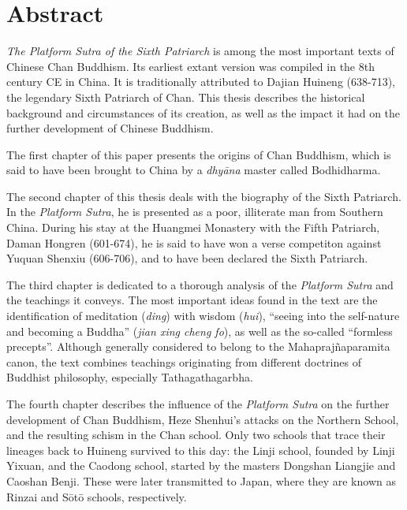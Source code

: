 \chapter*{Abstract}
\textit{The Platform Sutra of the Sixth Patriarch} is among the most important texts of Chinese Chan Buddhism.
Its earliest extant version was compiled in the 8th century CE in China.
It is traditionally attributed to Dajian Huineng (638-713), the legendary Sixth Patriarch of Chan.
This thesis describes the historical background and circumstances of its creation, as well as the impact it had on the further development of Chinese Buddhism.

The first chapter of this paper presents the origins of Chan Buddhism, which is said to have been brought to China by a \textit{dhyāna} master called Bodhidharma.

The second chapter of this thesis deals with the biography of the Sixth Patriarch.
In the \textit{Platform Sutra}, he is presented as a poor, illiterate man from Southern China.
During his stay at the Huangmei Monastery with the Fifth Patriarch, Daman Hongren (601-674), he is said to have won a verse competiton against Yuquan Shenxiu (606-706), and to have been declared the Sixth Patriarch.

The third chapter is dedicated to a thorough analysis of the \textit{Platform Sutra} and the teachings it conveys.
The most important ideas found in the text are the identification of meditation (\textit{ding}) with wisdom (\textit{hui}), ``seeing into the self-nature and becoming a Buddha'' (\textit{jian xing cheng fo}), as well as the so-called ``formless precepts''.
Although generally considered to belong to the Mahaprajñaparamita canon, the text combines teachings originating from different doctrines of Buddhist philosophy, especially Tathagathagarbha.

The fourth chapter describes the influence of the \textit{Platform Sutra} on the further development of Chan Buddhism, Heze Shenhui's attacks on the Northern School, and the resulting schism in the Chan school.
Only two schools that trace their lineages back to Huineng survived to this day: the Linji school, founded by Linji Yixuan, and the Caodong school, started by the masters Dongshan Liangjie and Caoshan Benji.
These were later transmitted to Japan, where they are known as Rinzai and Sōtō schools, respectively.
